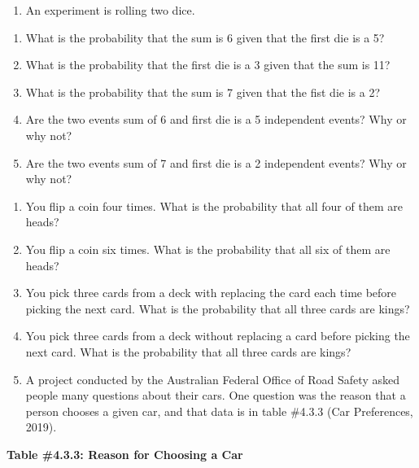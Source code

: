 \documentclass[]{book}
\providecommand{\tightlist}{%
  \setlength{\itemsep}{0pt}\setlength{\parskip}{0pt}}
\begin{document}
\begin{enumerate}
\def\labelenumi{\arabic{enumi}.}
\setcounter{enumi}{5}
\tightlist
\item
  An experiment is rolling two dice.
\end{enumerate}

\begin{enumerate}
\def\labelenumi{\alph{enumi}.}
\tightlist
\item
  What is the probability that the sum is 6 given that the first die is a 5?
\item
  What is the probability that the first die is a 3 given that the sum is 11?
\item
  What is the probability that the sum is 7 given that the fist die is a 2?
\item
  Are the two events sum of 6 and first die is a 5 independent events? Why or why not?
\item
  Are the two events sum of 7 and first die is a 2 independent events? Why or why not?
\end{enumerate}

\begin{enumerate}
\def\labelenumi{\arabic{enumi}.}
\setcounter{enumi}{6}
\item
  You flip a coin four times. What is the probability that all four of them are heads?
\item
  You flip a coin six times. What is the probability that all six of them are heads?
\item
  You pick three cards from a deck with replacing the card each time before picking the next card. What is the probability that all three cards are kings?
\item
  You pick three cards from a deck without replacing a card before picking the next card. What is the probability that all three cards are kings?
\item
  A project conducted by the Australian Federal Office of Road Safety asked people many questions about their cars. One question was the reason that a person chooses a given car, and that data is in table \#4.3.3 (Car Preferences, 2019).
\end{enumerate}

\textbf{Table \#4.3.3: Reason for Choosing a Car}
\end{document}
